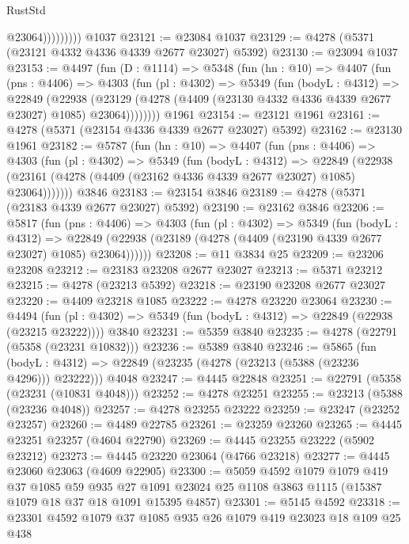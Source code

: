 \begin{lexlean}{RustStd}
\begin{coremodule}
                      @23064)))))))))
    @1037
@23121 := @23084 @1037
@23129 := @4278 (@5371 (@23121 @4332 @4336 @4339 @2677 @23027) @5392)
@23130 := @23094 @1037
@23153 := @4497
    (fun (D : @1114) =>
    @5348
      (fun (hn : @10) =>
      @4407
        (fun (pns : @4406) =>
        @4303
          (fun (pl : @4302) =>
          @5349
            (fun (bodyL : @4312) =>
            @22849
              (@22938
                (@23129 (@4278 (@4409 (@23130 @4332 @4336 @4339 @2677 @23027) @1085) @23064))))))))
    @1961
@23154 := @23121 @1961
@23161 := @4278 (@5371 (@23154 @4336 @4339 @2677 @23027) @5392)
@23162 := @23130 @1961
@23182 := @5787
    (fun (hn : @10) =>
    @4407
      (fun (pns : @4406) =>
      @4303
        (fun (pl : @4302) =>
        @5349
          (fun (bodyL : @4312) =>
          @22849
            (@22938 (@23161 (@4278 (@4409 (@23162 @4336 @4339 @2677 @23027) @1085) @23064)))))))
    @3846
@23183 := @23154 @3846
@23189 := @4278 (@5371 (@23183 @4339 @2677 @23027) @5392)
@23190 := @23162 @3846
@23206 := @5817
    (fun (pns : @4406) =>
    @4303
      (fun (pl : @4302) =>
      @5349
        (fun (bodyL : @4312) =>
        @22849 (@22938 (@23189 (@4278 (@4409 (@23190 @4339 @2677 @23027) @1085) @23064))))))
@23208 := @11 @3834 @25
@23209 := @23206 @23208
@23212 := @23183 @23208 @2677 @23027
@23213 := @5371 @23212
@23215 := @4278 (@23213 @5392)
@23218 := @23190 @23208 @2677 @23027
@23220 := @4409 @23218 @1085
@23222 := @4278 @23220 @23064
@23230 := @4494
    (fun (pl : @4302) => @5349 (fun (bodyL : @4312) => @22849 (@22938 (@23215 @23222))))
    @3840
@23231 := @5359 @3840
@23235 := @4278 (@22791 (@5358 (@23231 @10832)))
@23236 := @5389 @3840
@23246 := @5865
    (fun (bodyL : @4312) => @22849 (@23235 (@4278 (@23213 (@5388 (@23236 @4296))) @23222)))
    @4048
@23247 := @4445 @22848
@23251 := @22791 (@5358 (@23231 (@10831 @4048)))
@23252 := @4278 @23251
@23255 := @23213 (@5388 (@23236 @4048))
@23257 := @4278 @23255 @23222
@23259 := @23247 (@23252 @23257)
@23260 := @4489 @22785
@23261 := @23259 @23260
@23265 := @4445 @23251 @23257 (@4604 @22790)
@23269 := @4445 @23255 @23222 (@5902 @23212)
@23273 := @4445 @23220 @23064 (@4766 @23218)
@23277 := @4445 @23060 @23063 (@4609 @22905)
@23300 := @5059
    @4592
    @1079
    @1079
    @419
    @37
    @1085
    @59
    @935
    @27
    @1091
    @23024
    @25
    @1108
    @3863
    @1115
    (@15387 @1079 @18 @37 @18 @1091 @15395 @4857)
@23301 := @5145 @4592
@23318 := @23301
    @4592
    @1079
    @37
    @1085
    @935
    @26
    @1079
    @419
    @23023
    @18
    @109
    @25
    @438

\end{coremodule}
\end{lexlean}
